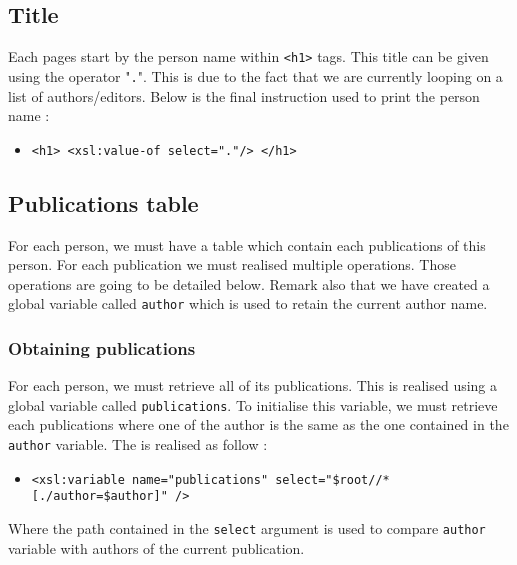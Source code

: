 \documentclass{article}
\begin{document}
\subsection{Title}
Each pages start by the person name within \verb|<h1>| tags. This title can be given using the operator "\verb|.|". This is due to the fact that we are currently looping on a list of authors/editors. Below is the final instruction used to print the person name : 
\begin{itemize}
\item \begin{verbatim}
<h1> <xsl:value-of select="."/> </h1>
\end{verbatim}
\end{itemize}

\subsection{Publications table}
For each person, we must have a table which contain each publications of this person. For each publication we must realised multiple operations. Those operations are going to be detailed below. Remark also that we have created a global variable called \verb|author| which is used to retain the current author name.

\subsubsection{Obtaining publications}
For each person, we must retrieve all of its publications. This is realised using a global variable called \verb|publications|. To initialise this variable, we must retrieve each publications where one of the author is the same as the one contained in the \verb|author| variable. The is realised as follow :
\begin{itemize}
\item \begin{verbatim}
<xsl:variable name="publications" select="$root//*[./author=$author]" />
\end{verbatim}
\end{itemize}
Where the path contained in the \verb|select| argument is used to compare \verb|author| variable with authors of the current publication.
\end{document}
